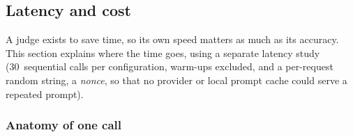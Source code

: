 \documentclass[11pt,letterpaper]{article}
\newcommand{\term}[1]{\emph{#1}}
\newcommand{\LatNSeq}{30}
\begin{document}
\subsection{Latency and cost}\label{jb:sec:latency}

A judge exists to save time, so its own speed matters as much as its accuracy. This section explains
where the time goes, using a separate latency study (\LatNSeq\ sequential calls per configuration,
warm-ups excluded, and a per-request random string, a \term{nonce}, so that no provider or local prompt
cache could serve a repeated prompt).

\subsubsection{Anatomy of one call}
\end{document}
